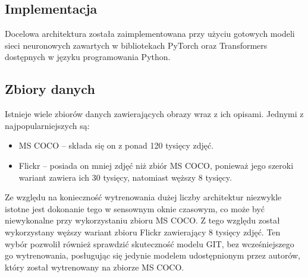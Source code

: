 \subsection{Implementacja}
Docelowa architektura została zaimplementowana przy użyciu gotowych modeli sieci neuronowych zawartych w bibliotekach PyTorch \cite{pytorch} oraz Transformers \cite{wolf-etal-2020-transformers} dostępnych w języku programowania Python.
\subsection{Zbiory danych}
Istnieje wiele zbiorów danych zawierających obrazy wraz z ich opisami. Jednymi z najpopularniejszych są:
\begin{itemize}
    \item MS COCO \cite{mscoco} -- składa się on z ponad 120 tysięcy zdjęć.
    \item Flickr \cite{flickr30k} -- posiada on mniej zdjęć niż zbiór MS COCO, ponieważ jego szeroki wariant zawiera ich 30 tysięcy, natomiast węższy 8 tysięcy.
\end{itemize}
Ze względu na konieczność wytrenowania dużej liczby architektur niezwykle istotne jest dokonanie tego w sensownym oknie czasowym, co może być niewykonalne przy wykorzystaniu zbioru MS COCO. Z tego względu został wykorzystany węższy wariant zbioru Flickr zawierający 8 tysięcy zdjęć. Ten wybór pozwolił również sprawdzić skuteczność modelu GIT, bez wcześniejszego go wytrenowania, posługując się jedynie modelem udostępnionym przez autorów, który został wytrenowany na zbiorze MS COCO.
